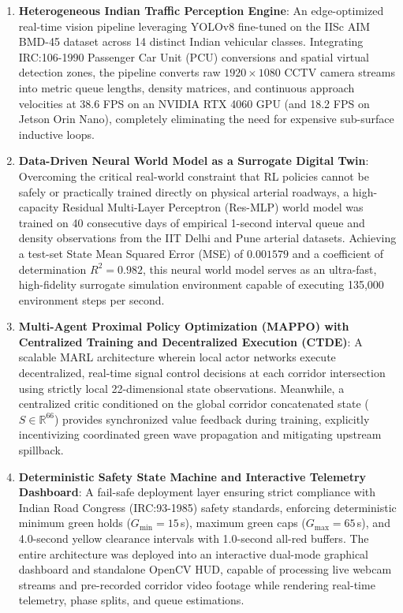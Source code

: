 \begin{enumerate}
    \item \textbf{Heterogeneous Indian Traffic Perception Engine}: An edge-optimized real-time vision pipeline leveraging YOLOv8 fine-tuned on the IISc AIM BMD-45 dataset across 14 distinct Indian vehicular classes. Integrating IRC:106-1990 Passenger Car Unit (PCU) conversions and spatial virtual detection zones, the pipeline converts raw $1920\times1080$ CCTV camera streams into metric queue lengths, density matrices, and continuous approach velocities at 38.6 FPS on an NVIDIA RTX 4060 GPU (and 18.2 FPS on Jetson Orin Nano), completely eliminating the need for expensive sub-surface inductive loops.
    
    \item \textbf{Data-Driven Neural World Model as a Surrogate Digital Twin}: Overcoming the critical real-world constraint that RL policies cannot be safely or practically trained directly on physical arterial roadways, a high-capacity Residual Multi-Layer Perceptron (Res-MLP) world model was trained on 40 consecutive days of empirical 1-second interval queue and density observations from the IIT Delhi and Pune arterial datasets. Achieving a test-set State Mean Squared Error (MSE) of $0.001579$ and a coefficient of determination $R^2 = 0.982$, this neural world model serves as an ultra-fast, high-fidelity surrogate simulation environment capable of executing 135,000 environment steps per second.
    
    \item \textbf{Multi-Agent Proximal Policy Optimization (MAPPO) with Centralized Training and Decentralized Execution (CTDE)}: A scalable MARL architecture wherein local actor networks execute decentralized, real-time signal control decisions at each corridor intersection using strictly local 22-dimensional state observations. Meanwhile, a centralized critic conditioned on the global corridor concatenated state ($S \in \mathbb{R}^{66}$) provides synchronized value feedback during training, explicitly incentivizing coordinated green wave propagation and mitigating upstream spillback.
    
    \item \textbf{Deterministic Safety State Machine and Interactive Telemetry Dashboard}: A fail-safe deployment layer ensuring strict compliance with Indian Road Congress (IRC:93-1985) safety standards, enforcing deterministic minimum green holds ($G_{\min} = 15$\,s), maximum green caps ($G_{\max} = 65$\,s), and 4.0-second yellow clearance intervals with 1.0-second all-red buffers. The entire architecture was deployed into an interactive dual-mode graphical dashboard and standalone OpenCV HUD, capable of processing live webcam streams and pre-recorded corridor video footage while rendering real-time telemetry, phase splits, and queue estimations.
\end{enumerate}


